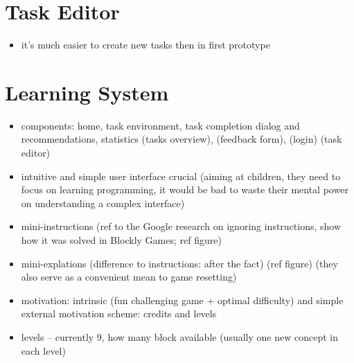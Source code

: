 



\section{Task Editor}
\label{sec:robomission.system}

\begin{itemize}
\item it's much easier to create new tasks then in first prototype
\end{itemize}




\section{Learning System}
\label{sec:robomission.system}

\begin{itemize}
\item components: home, task environment, task completion dialog and recommendations, statistics (tasks overview), (feedback form), (login) (task editor)
\item intuitive and simple user interface crucial (aiming at children, they need to focus on learning programming, it would be bad to waste their mental power on understanding a complex interface)
\item mini-instructions (ref to the Google research on ignoring instructions, show how it was solved in Blockly Games; ref figure)
\item mini-explations (difference to instructions: after the fact) (ref figure) (they also serve as a convenient mean to game resetting)
\item motivation: intrinsic (fun challenging game + optimal difficulty) and simple external motivation scheme: credits and levels
\item levels -- currently 9, how many block available (usually one new concept in each level)
\end{itemize}


